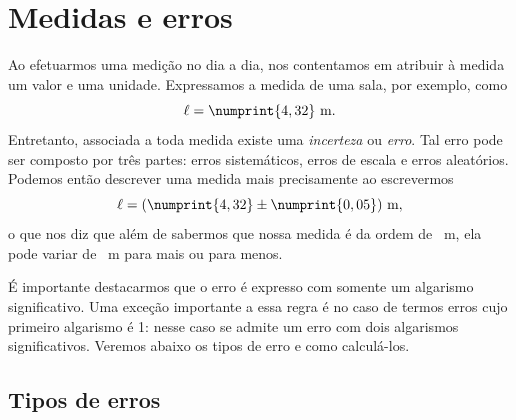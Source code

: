 \section{Medidas e erros}

Ao efetuarmos uma medição no dia a dia, nos contentamos em atribuir à medida um valor e uma unidade. Expressamos a medida de uma sala, por exemplo, como
\begin{equation}
	\ell = \numprint{4,32}~\textrm{m}.
\end{equation}
Entretanto, associada a toda medida existe uma \emph{incerteza} ou \emph{erro}. Tal erro pode ser composto por três partes: erros sistemáticos, erros de escala e erros aleatórios. Podemos então descrever uma medida mais precisamente ao escrevermos
\begin{equation}
	\ell = (\numprint{4,32} \pm \numprint{0,05})~\textrm{m},
\end{equation}
o que nos diz que além de sabermos que nossa medida é da ordem de ~m, ela pode variar de ~m para mais ou para menos.

É importante destacarmos que o erro é expresso com somente um algarismo significativo. Uma exceção importante a essa regra é no caso de termos erros cujo primeiro algarismo é 1: nesse caso se admite um erro com dois algarismos significativos. Veremos abaixo os tipos de erro e como calculá-los.


\subsection{Tipos de erros}

